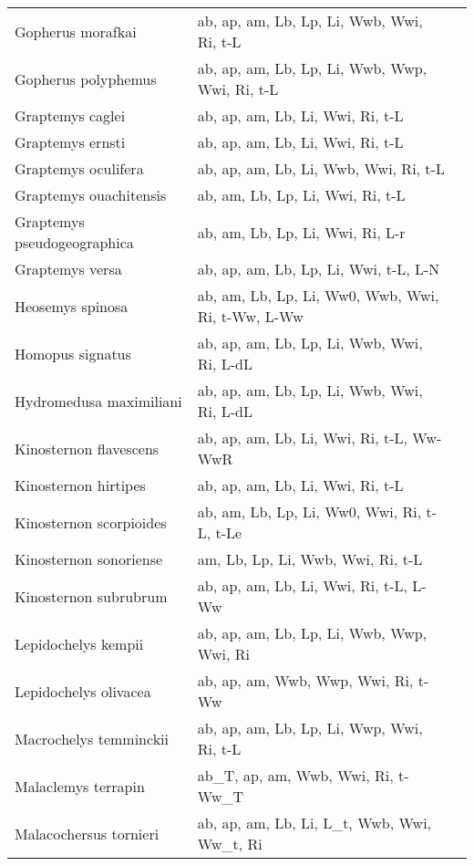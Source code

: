 \documentclass{article}
\begin{document}
{\begin{longtable}[c]{p{3.5cm}p{5.5cm}p{5.5cm}}
Gopherus morafkai &  ab, ap, am, Lb, Lp, Li, Wwb, Wwi, Ri, t-L & \citet{Brid2012,AverChri2018} \\
Gopherus polyphemus &  ab, ap, am, Lb, Lp, Li, Wwb, Wwp, Wwi, Ri, t-L & \citet{MushWils1994,ErnsBarb1989} \\
Graptemys caglei &  ab, ap, am, Lb, Li, Wwi, Ri, t-L & \citet{Lind1999} \\
Graptemys ernsti &  ab, ap, am, Lb, Li, Wwi, Ri, t-L & \citet{Lind1999} \\
Graptemys oculifera &  ab, ap, am, Lb, Li, Wwb, Wwi, Ri, t-L & \citet{JoneHart1995} \\
Graptemys ouachitensis &  ab, am, Lb, Lp, Li, Wwi, Ri, t-L & \citet{Lind1999} \\
Graptemys pseudogeographica &  ab, am, Lb, Lp, Li, Wwi, Ri, L-r & \citet{Webb1961} \\
Graptemys versa &  ab, ap, am, Lb, Lp, Li, Wwi, t-L, L-N & \citet{Lind2005} \\
Heosemys spinosa &  ab, am, Lb, Lp, Li, Ww0, Wwb, Wwi, Ri, t-Ww, L-Ww & \citet{Goet2007} \\
Homopus signatus &  ab, ap, am, Lb, Lp, Li, Wwb, Wwi, Ri, L-dL & \citet{Loeh2004} \\
Hydromedusa maximiliani &  ab, ap, am, Lb, Lp, Li, Wwb, Wwi, Ri, L-dL & \citet{MartSouz2008,NoveSous2008} \\
Kinosternon flavescens &  ab, ap, am, Lb, Li, Wwi, Ri, t-L, Ww-WwR & \citet{Iver1991} \\
Kinosternon hirtipes &  ab, ap, am, Lb, Li, Wwi, Ri, t-L & \citet{IverBart1991} \\
Kinosternon scorpioides &  ab, am, Lb, Lp, Li, Ww0, Wwi, Ri, t-L, t-Le & \citet{BragFern2021,Iver2010} \\
Kinosternon sonoriense &  am, Lb, Lp, Li, Wwb, Wwi, Ri, t-L & \citet{HensJone2010} \\
Kinosternon subrubrum &  ab, ap, am, Lb, Li, Wwi, Ri, t-L, L-Ww & \citet{Iver1979} \\
Lepidochelys kempii &  ab, ap, am, Lb, Lp, Li, Wwb, Wwp, Wwi, Ri & \citet{Spot2004} \\
Lepidochelys olivacea &  ab, ap, am, Wwb, Wwp, Wwi, Ri, t-Ww & \citet{MarkKirk1988} \\
Macrochelys temminckii &  ab, ap, am, Lb, Lp, Li, Wwp, Wwi, Ri, t-L & \citet{Dobi1971} \\
Malaclemys terrapin &  ab\_T, ap, am, Wwb, Wwi, Ri, t-Ww\_T & \citet{RoosKell1996} \\
Malacochersus tornieri &  ab, ap, am, Lb, Li, L\_t, Wwb, Wwi, Ww\_t, Ri & \citet{EwerHatc2004} \\

\end{longtable}}
\end{document}
